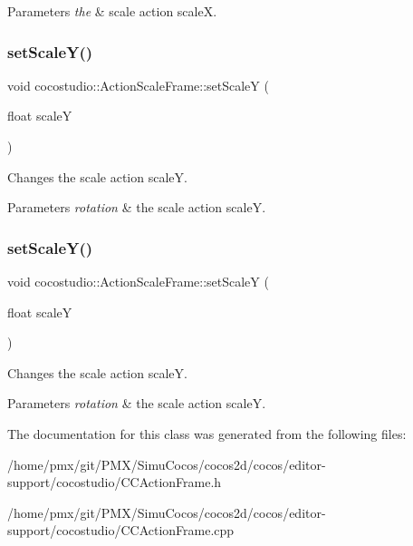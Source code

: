 \begin{DoxyParams}{Parameters}
{\em the} & scale action scaleX. \\
\hline
\end{DoxyParams}
\mbox{\label{classcocostudio_1_1ActionScaleFrame_a987134a143fa3e7119faac0fc8e31935}} 
\subsubsection{\texorpdfstring{set\+Scale\+Y()}{setScaleY()}\hspace{0.1cm}{\footnotesize\ttfamily [1/2]}}
{\footnotesize\ttfamily void cocostudio\+::\+Action\+Scale\+Frame\+::set\+ScaleY (\begin{DoxyParamCaption}\item[{float}]{scaleY }\end{DoxyParamCaption})}

Changes the scale action scaleY.


\begin{DoxyParams}{Parameters}
{\em rotation} & the scale action scaleY. \\
\hline
\end{DoxyParams}
\mbox{\label{classcocostudio_1_1ActionScaleFrame_a987134a143fa3e7119faac0fc8e31935}} 
\subsubsection{\texorpdfstring{set\+Scale\+Y()}{setScaleY()}\hspace{0.1cm}{\footnotesize\ttfamily [2/2]}}
{\footnotesize\ttfamily void cocostudio\+::\+Action\+Scale\+Frame\+::set\+ScaleY (\begin{DoxyParamCaption}\item[{float}]{scaleY }\end{DoxyParamCaption})}

Changes the scale action scaleY.


\begin{DoxyParams}{Parameters}
{\em rotation} & the scale action scaleY. \\
\hline
\end{DoxyParams}


The documentation for this class was generated from the following files\+:\begin{DoxyCompactItemize}
\item 
/home/pmx/git/\+P\+M\+X/\+Simu\+Cocos/cocos2d/cocos/editor-\/support/cocostudio/C\+C\+Action\+Frame.\+h\item 
/home/pmx/git/\+P\+M\+X/\+Simu\+Cocos/cocos2d/cocos/editor-\/support/cocostudio/C\+C\+Action\+Frame.\+cpp\end{DoxyCompactItemize}
